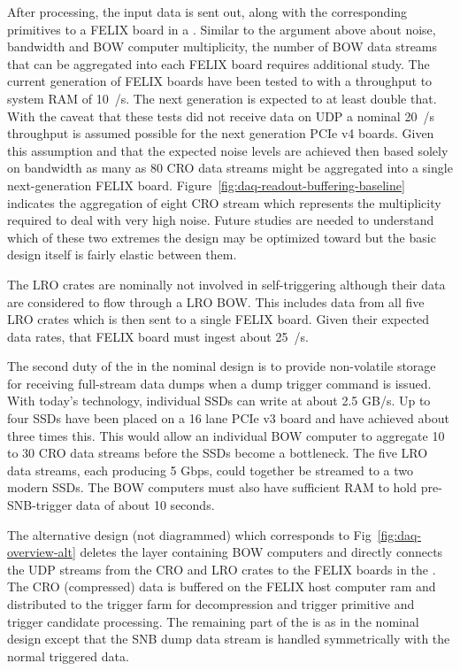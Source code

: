 After processing, the input data is sent out, along with the
corresponding primitives to a FELIX board in a . 
Similar to the argument above about noise, bandwidth and BOW computer
multiplicity, the number of BOW data streams that can be aggregated
into each FELIX board requires additional study. 
The current generation of FELIX boards have been tested to with a
throughput to system RAM of \SI{10}{\GB/\s}. 
The next generation is expected to at least double that. 
With the caveat that these tests did not receive data on UDP a nominal
\SI{20}{\GB/\s} throughput is assumed possible for the next generation
PCIe v4 boards. 
Given this assumption and that the expected noise levels are achieved
then based solely on bandwidth as many as 80 CRO data streams might be
aggregated into a single next-generation FELIX board. 
Figure~\ref{fig:daq-readout-buffering-baseline} indicates the
aggregation of eight CRO stream which represents the multiplicity
required to deal with very high noise. 
Future studies are needed to understand which of these two extremes
the design may be optimized toward but the basic design itself is
fairly elastic between them.

The LRO crates are nominally not involved in self-triggering although
their data are considered to flow through a LRO BOW. 
This includes data from all five LRO crates which is then sent to a
single FELIX board. 
Given their expected data rates, that FELIX board must ingest about
\SI{25}{\GB/\s}.

The second duty of the  in the nominal design is to
provide non-volatile storage for receiving full-stream data dumps when
a  dump trigger command is issued. 
With today's technology, individual SSDs can write at about 2.5 GB/s. 
Up to four SSDs have been placed on a 16 lane PCIe v3 board and have
achieved about three times this. 
This would allow an individual BOW computer to aggregate 10 to 30 CRO
data streams before the SSDs become a bottleneck. 
The five LRO data streams, each producing 5 Gbps, could together be
streamed to a two modern SSDs. 
The BOW computers must also have sufficient RAM to hold
pre-SNB-trigger data of about 10 seconds.

The alternative design (not diagrammed) which corresponds to
Fig~\ref{fig:daq-overview-alt} deletes the layer containing BOW
computers and directly connects the UDP streams from the CRO and LRO
crates to the FELIX boards in the . 
The CRO (compressed) data is buffered on the FELIX host computer ram
and distributed to the trigger farm for decompression and trigger
primitive and trigger candidate processing. 
The remaining part of the  is as in the nominal
design except that the SNB dump data stream is handled symmetrically
with the normal triggered data.
